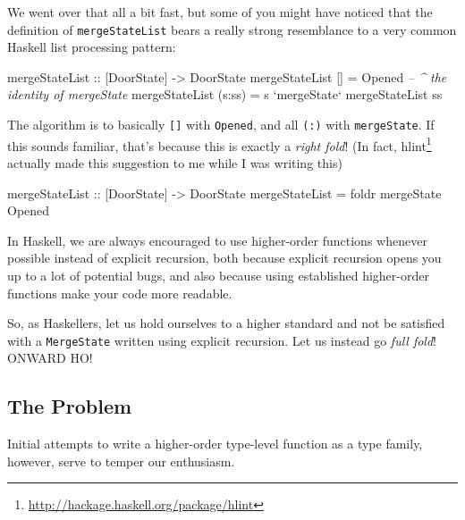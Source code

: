 \documentclass[]{article}
\newenvironment{Shaded}{}{}
\newcommand{\CommentTok}[1]{\textcolor[rgb]{0.38,0.63,0.69}{\textit{#1}}}
\newcommand{\DataTypeTok}[1]{\textcolor[rgb]{0.56,0.13,0.00}{#1}}
\newcommand{\FunctionTok}[1]{\textcolor[rgb]{0.02,0.16,0.49}{#1}}
\newcommand{\NormalTok}[1]{#1}
\newcommand{\OtherTok}[1]{\textcolor[rgb]{0.00,0.44,0.13}{#1}}
\renewcommand{\href}[2]{#2\footnote{\url{#1}}}
\begin{document}
We went over that all a bit fast, but some of you might have noticed that the
definition of \texttt{mergeStateList} bears a really strong resemblance to a
very common Haskell list processing pattern:

\begin{Shaded}
\begin{Highlighting}[]
\OtherTok{mergeStateList ::}\NormalTok{ [}\DataTypeTok{DoorState}\NormalTok{] }\OtherTok{->} \DataTypeTok{DoorState}
\NormalTok{mergeStateList []     }\FunctionTok{=} \DataTypeTok{Opened}               \CommentTok{-- ^ the identity of mergeState}
\NormalTok{mergeStateList (s}\FunctionTok{:}\NormalTok{ss) }\FunctionTok{=}\NormalTok{ s }\OtherTok{`mergeState`}\NormalTok{ mergeStateList ss}
\end{Highlighting}
\end{Shaded}

The algorithm is to basically \texttt{{[}{]}} with \texttt{Opened}, and all
\texttt{(:)} with \texttt{mergeState}. If this sounds familiar, that's because
this is exactly a \emph{right fold}! (In fact,
\href{http://hackage.haskell.org/package/hlint}{hlint} actually made this
suggestion to me while I was writing this)

\begin{Shaded}
\begin{Highlighting}[]
\OtherTok{mergeStateList ::}\NormalTok{ [}\DataTypeTok{DoorState}\NormalTok{] }\OtherTok{->} \DataTypeTok{DoorState}
\NormalTok{mergeStateList }\FunctionTok{=}\NormalTok{ foldr mergeState }\DataTypeTok{Opened}
\end{Highlighting}
\end{Shaded}

In Haskell, we are always encouraged to use higher-order functions whenever
possible instead of explicit recursion, both because explicit recursion opens
you up to a lot of potential bugs, and also because using established
higher-order functions make your code more readable.

So, as Haskellers, let us hold ourselves to a higher standard and not be
satisfied with a \texttt{MergeState} written using explicit recursion. Let us
instead go \emph{full fold}! ONWARD HO!

\hypertarget{the-problem}{%
\subsection{The Problem}\label{the-problem}}

Initial attempts to write a higher-order type-level function as a type family,
however, serve to temper our enthusiasm.
\end{document}
